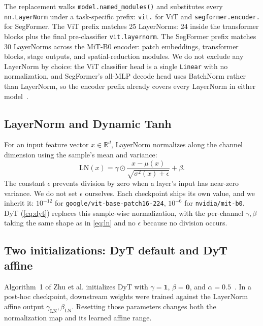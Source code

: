 \documentclass[10pt,twocolumn,letterpaper]{article}
\newcommand{\lnorm}{\mathrm{LN}}
\begin{document}
The replacement walks \texttt{model.named\_modules()} and substitutes every \texttt{nn.LayerNorm} under a task-specific prefix: \texttt{vit.} for ViT and \texttt{segformer.encoder.} for SegFormer. The ViT prefix matches 25 LayerNorms: 24 inside the transformer blocks plus the final pre-classifier \texttt{vit.layernorm}. The SegFormer prefix matches 30 LayerNorms across the MiT-B0 encoder: patch embeddings, transformer blocks, stage outputs, and spatial-reduction modules. We do not exclude any LayerNorm by choice: the ViT classifier head is a single \texttt{Linear} with no normalization, and SegFormer's all-MLP decode head uses BatchNorm rather than LayerNorm, so the encoder prefix already covers every LayerNorm in either model~\cite{xie2021segformer}.

\subsection{LayerNorm and Dynamic Tanh}
\label{subsec:dyt}

For an input feature vector $x \in \mathbb{R}^d$, LayerNorm normalizes along the channel dimension using the sample's mean and variance:
\begin{equation}
    \lnorm(x) = \gamma \odot \frac{x - \mu(x)}{\sqrt{\sigma^2(x) + \epsilon}} + \beta.
    \label{eq:ln}
\end{equation}
The constant $\epsilon$ prevents division by zero when a layer's input has near-zero variance. We do not set $\epsilon$ ourselves. Each checkpoint ships its own value, and we inherit it: $10^{-12}$ for \texttt{google/vit-base-patch16-224}, $10^{-6}$ for \texttt{nvidia/mit-b0}. DyT (\cref{eq:dyt}) replaces this sample-wise normalization, with the per-channel $\gamma, \beta$ taking the same shape as in \cref{eq:ln} and no $\epsilon$ because no division occurs.

\subsection{Two initializations: DyT default and DyT affine}
\label{subsec:init}

Algorithm~1 of Zhu et al. initializes DyT with $\gamma = \mathbf{1}$, $\beta = \mathbf{0}$, and $\alpha = 0.5$~\cite{zhu2025dyt}. In a post-hoc checkpoint, downstream weights were trained against the LayerNorm affine output $\gamma_{\mathrm{LN}}, \beta_{\mathrm{LN}}$. Resetting those parameters changes both the normalization map and its learned affine range.
\end{document}
